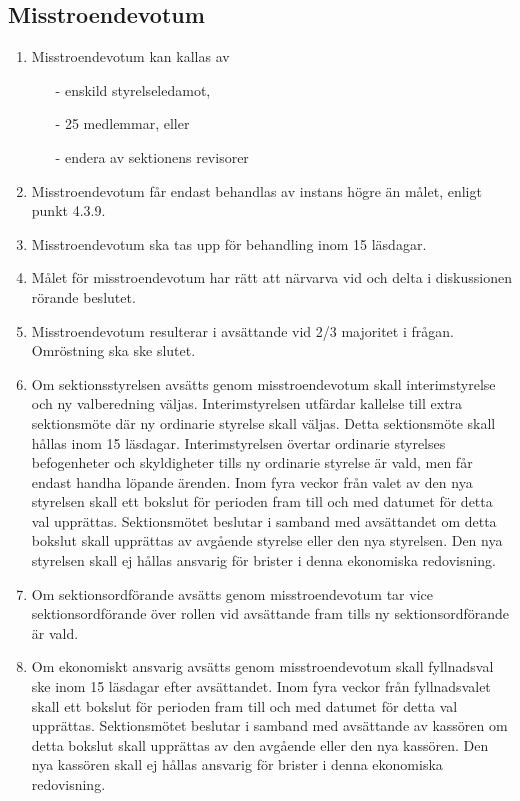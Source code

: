 \documentclass[11pt,a4paper]{article}
\begin{document}
\subsection{Misstroendevotum}\label{subsec:misstroende}
\begin{enumerate}[\thesubsection.1]

  \item Misstroendevotum kan kallas av
		\begin{itemize}
			\item[-] enskild styrelseledamot, 
			\item[-] 25 medlemmar, eller
			\item[-] endera av sektionens revisorer
		\end{itemize}
	
	\item Misstroendevotum får endast behandlas av instans högre än målet, enligt punkt 4.3.9. %
	

	\item Misstroendevotum ska tas upp för behandling inom 15 läsdagar.

	\item Målet för misstroendevotum har rätt att närvarva vid och delta i diskussionen rörande beslutet.

	\item Misstroendevotum resulterar i avsättande vid 2/3 majoritet i frågan. Omröstning ska ske slutet. 

	\item Om sektionsstyrelsen avsätts genom misstroendevotum skall interimstyrelse och ny valberedning väljas. Interimstyrelsen utfärdar kallelse till extra sektionsmöte där ny ordinarie styrelse skall väljas. Detta sektionsmöte skall hållas inom 15 läsdagar. Interimstyrelsen övertar ordinarie styrelses befogenheter och skyldigheter tills ny ordinarie styrelse är vald, men får endast handha löpande ärenden. Inom fyra veckor från valet av den nya styrelsen skall ett bokslut för perioden fram till och med datumet för detta val upprättas. Sektionsmötet beslutar i samband med avsättandet om detta bokslut skall upprättas av avgående styrelse eller den nya styrelsen. Den nya styrelsen skall ej hållas ansvarig för brister i denna ekonomiska redovisning.

	\item Om sektionsordförande avsätts genom misstroendevotum tar vice sektionsordförande över rollen vid avsättande fram tills ny sektionsordförande är vald.

	\item Om ekonomiskt ansvarig avsätts genom misstroendevotum skall fyllnadsval ske inom 15 läsdagar efter avsättandet. Inom fyra veckor från fyllnadsvalet skall ett bokslut för perioden fram till och med datumet för detta val upprättas. Sektionsmötet beslutar i samband med avsättande av kassören om detta bokslut skall upprättas av den avgående eller den nya kassören. Den nya kassören skall ej hållas  ansvarig för brister i denna ekonomiska redovisning. 


\end{enumerate}
\end{document}
